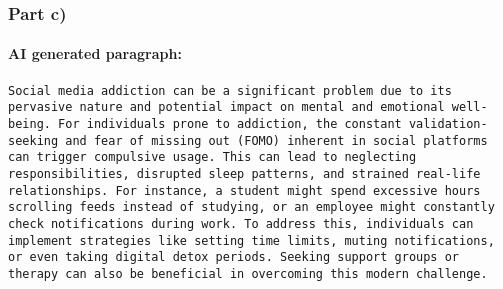\documentclass[a4paper,12pt,english]{article}
\begin{document}
\subsubsection*{Part c)}
\paragraph*{AI generated paragraph:}
\texttt{Social media addiction can be a significant problem due to its pervasive nature and potential impact on mental and emotional well-being. For individuals prone to addiction, the constant validation-seeking and fear of missing out (FOMO) inherent in social platforms can trigger compulsive usage. This can lead to neglecting responsibilities, disrupted sleep patterns, and strained real-life relationships. For instance, a student might spend excessive hours scrolling feeds instead of studying, or an employee might constantly check notifications during work. To address this, individuals can implement strategies like setting time limits, muting notifications, or even taking digital detox periods. Seeking support groups or therapy can also be beneficial in overcoming this modern challenge.}
\end{document}
